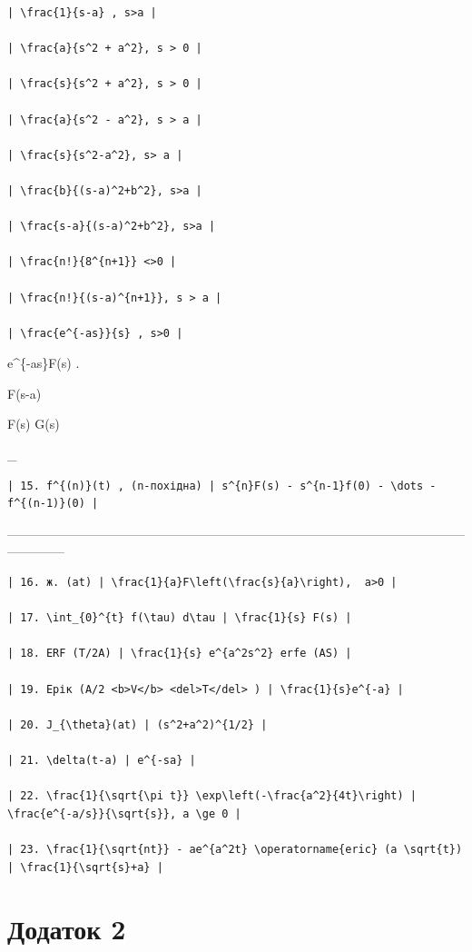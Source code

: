 \documentclass[
]{article}
\begin{document}
\begin{verbatim}
| \frac{1}{s-a} , s>a |

| \frac{a}{s^2 + a^2}, s > 0 |

| \frac{s}{s^2 + a^2}, s > 0 |

| \frac{a}{s^2 - a^2}, s > a |

| \frac{s}{s^2-a^2}, s> a |

| \frac{b}{(s-a)^2+b^2}, s>a |

| \frac{s-a}{(s-a)^2+b^2}, s>a |

| \frac{n!}{8^{n+1}} <>0 |

| \frac{n!}{(s-a)^{n+1}}, s > a |

| \frac{e^{-as}}{s} , s>0 |
\end{verbatim}

e\^{}\{-as\}F(s) . \textbar{}

F(s-a) \textbar{}

F(s) G(s) \textbar{}

\_ \textbar{}

\begin{verbatim}
| 15. f^{(n)}(t) , (n-похідна) | s^{n}F(s) - s^{n-1}f(0) - \dots - f^{(n-1)}(0) |
\end{verbatim}

\textbar------------------------------------------------------------------------\textbar--------------------------------------------------\textbar{}

\begin{verbatim}
| 16. ж. (at) | \frac{1}{a}F\left(\frac{s}{a}\right),  a>0 |

| 17. \int_{0}^{t} f(\tau) d\tau | \frac{1}{s} F(s) |

| 18. ERF (T/2A) | \frac{1}{s} e^{a^2s^2} erfe (AS) |

| 19. Ерік (A/2 <b>V</b> <del>T</del> ) | \frac{1}{s}e^{-a} |

| 20. J_{\theta}(at) | (s^2+a^2)^{1/2} |

| 21. \delta(t-a) | e^{-sa} |

| 22. \frac{1}{\sqrt{\pi t}} \exp\left(-\frac{a^2}{4t}\right) | \frac{e^{-a/s}}{\sqrt{s}}, a \ge 0 |

| 23. \frac{1}{\sqrt{nt}} - ae^{a^2t} \operatorname{eric} (a \sqrt{t}) | \frac{1}{\sqrt{s}+a} |
\end{verbatim}

\section{Додаток 2}\label{ux434ux43eux434ux430ux442ux43eux43a-2}
\end{document}
